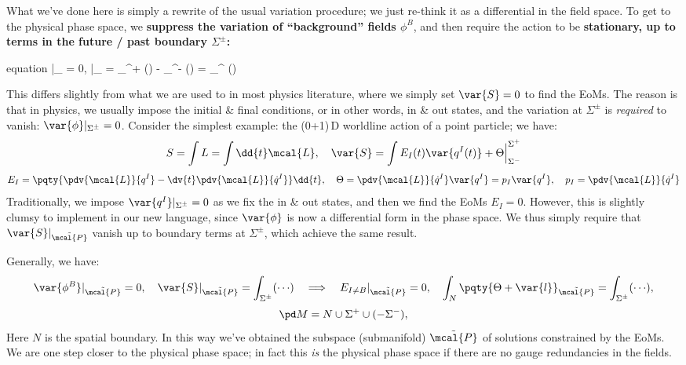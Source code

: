 \documentclass[a4paper
	,10pt
]{article}
\begin{document}
	What we've done here is simply a rewrite of the usual variation procedure; we just re-think it as a differential in the field space. To get to the physical phase space, we \textbf{suppress the variation of ``background'' fields $\phi^B$}, and then require the action to be \textbf{stationary, up to terms in the future / past boundary $\Sigma^\pm$:}
	\begin{empheq}{equation}
		|_{}
		= 0,
	\quad
		|_{}
		= \int_{\Sigma^+} ({\cdots})
			- \int_{\Sigma^-} ({\cdots})
		= \int_{\Sigma^\pm} ({\cdots})
	\end{empheq}
	
	This differs slightly from what we are used to in most physics literature, where we simply set $\var{S} = 0$ to find the EoMs. The reason is that in physics, we usually impose the initial \& final conditions, or in other words, in \& out states, and the variation at $\Sigma^\pm$ is \textit{required} to vanish: $\var{\phi}|_{\Sigma^\pm} = 0$. Consider the simplest example: the (0+1)\,D worldline action of a point particle; we have:
	\begin{equation}
		S = \int L = \int \dd{t} \mcal{L},
	\quad
		\var{S}
		= \int E_I(t) \var{q^I(t)}
			+ \Theta\Big|^{\Sigma^+}_{\Sigma^-}
	\end{equation}
	\vspace{-.5\baselineskip}
	\begin{equation}
		E_I = \pqty{
			\pdv{\mcal{L}}{q^I}
			- \dv{t} \pdv{\mcal{L}}{\dot{q}^I}
		} \dd{t},
	\quad
		\Theta
		= \pdv{\mcal{L}}{\dot{q}^I} \var{q^I}
		= p_I \var{q^I},
	\quad
		p_I = \pdv{\mcal{L}}{\dot{q}^I}
	\end{equation}
	Traditionally, we impose $\var{q^I}|_{\Sigma^\pm} = 0$ as we fix the in \& out states, and then we find the EoMs $E_I = 0$. 
	However, this is slightly clumsy to implement in our new language, since $\var{\phi}$ is now a differential form in the phase space. We thus simply require that $\var{S}|_{\tilde{\mcal{P}}}$ vanish up to boundary terms at $\Sigma^\pm$, which achieve the same result. 
	
	Generally, we have:
	\begin{equation}
		\var{\phi^B}|_{\tilde{\mcal{P}}}
		= 0,
	\quad
		\var{S}|_{\tilde{\mcal{P}}}
		= \int_{\Sigma^\pm} ({\cdots})
	\quad\Longrightarrow\quad
		E_{I\ne B}|_{\tilde{\mcal{P}}} = 0,
	\quad
		\int_N \pqty{\Theta + \var{l}}_{\tilde{\mcal{P}}}
		= \int_{\Sigma^\pm} ({\cdots}),
	\end{equation}
	\vspace{-.8\baselineskip}
	\begin{equation}
		\pd M = N \cup \Sigma^+ \cup (-\Sigma^-),
	\end{equation}
	Here $N$ is the spatial boundary. 
	In this way we've obtained the subspace (submanifold) $\tilde{\mcal{P}}$ of solutions constrained by the EoMs. We are one step closer to the physical phase space; in fact this \textit{is} the physical phase space if there are no gauge redundancies in the fields. 
	
\end{document}
